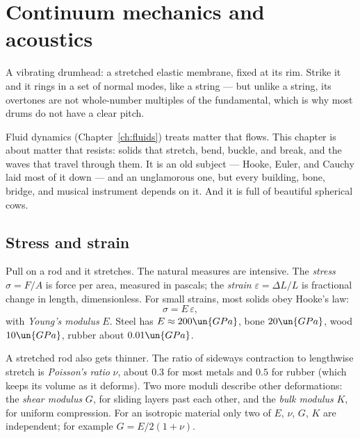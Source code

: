 \chapter{Continuum mechanics and acoustics}
\label{ch:continuum}



\begin{prototype}
A vibrating drumhead: a stretched elastic membrane, fixed at its rim. Strike it and it rings in a set of normal modes, like a string --- but unlike a string, its overtones are not whole-number multiples of the fundamental, which is why most drums do not have a clear pitch.
\end{prototype}

Fluid dynamics (Chapter~\ref{ch:fluids}) treats matter that flows. This chapter is about matter that resists: solids that stretch, bend, buckle, and break, and the waves that travel through them. It is an old subject --- Hooke, Euler, and Cauchy laid most of it down --- and an unglamorous one, but every building, bone, bridge, and musical instrument depends on it. And it is full of beautiful spherical cows.

\section{Stress and strain}

Pull on a rod and it stretches. The natural measures are intensive. The \emph{stress} $\sigma = F/A$ is force per area, measured in pascals; the \emph{strain} $\varepsilon = \Delta L/L$ is fractional change in length, dimensionless. For small strains, most solids obey Hooke's law:
\[
  \sigma = E\,\varepsilon ,
\]
with \emph{Young's modulus} $E$. Steel has $E\approx200\un{GPa}$, bone $20\un{GPa}$, wood $10\un{GPa}$, rubber about $0.01\un{GPa}$.

A stretched rod also gets thinner. The ratio of sideways contraction to lengthwise stretch is \emph{Poisson's ratio} $\nu$, about $0.3$ for most metals and $0.5$ for rubber (which keeps its volume as it deforms). Two more moduli describe other deformations: the \emph{shear modulus} $G$, for sliding layers past each other, and the \emph{bulk modulus} $K$, for uniform compression. For an isotropic material only two of $E$, $\nu$, $G$, $K$ are independent; for example $G = E/2(1+\nu)$.


